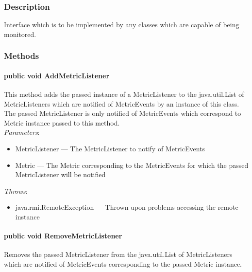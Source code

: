\documentclass[$Date: 2003/06/26 19:29:31 $]{glabarticle}
\begin{document}

\subsubsection{Description}

Interface which is to be implemented by any classes which are capable of being monitored.


\subsubsection{Methods}

 \paragraph{public void AddMetricListener}
 
 This method adds the passed instance of a MetricListener to the java.util.List
 of MetricListeners which are notified of MetricEvents by an
 instance of this class. The passed MetricListener is only notified of
 MetricEvents which correspond to Metric instance passed to this
 method. \\
 
 \textit{Parameters}:
 \begin{itemize}
 \item[] MetricListener --- The MetricListener to notify of MetricEvents
 \item[] Metric --- The Metric corresponding to the MetricEvents for which the passed MetricListener will be 
 notified
 \end{itemize}
 
 \textit{Throws}:
 \begin{itemize}
 \item[] java.rmi.RemoteException --- Thrown upon problems accessing the remote instance 
 \end{itemize}
 
 \paragraph{public void RemoveMetricListener}
 
 Removes the passed MetricListener from the java.util.List of MetricListeners
 which are notified of MetricEvents corresponding to the passed
 Metric instance. \\
 
\end{document}
